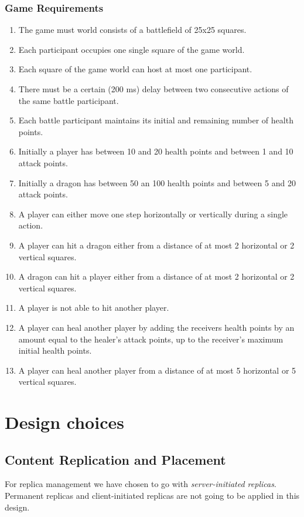 \documentclass{article}
\begin{document}
\subsubsection{Game Requirements}
\begin{enumerate}
	\item The game must world consists of a battlefield of 25x25 squares.
	\item Each participant occupies one single  square of the game world.
	\item Each square of the game world can host at most one participant.
	\item There must be a certain (200 ms) delay between two consecutive actions of the same battle participant.
	\item Each battle participant maintains its initial and remaining number of health points.
	\item Initially a player has between 10 and 20 health points and between 1 and 10 attack points.
	\item Initially a dragon has between 50 an 100 health points and between 5 and 20 attack points.
	\item A player can either move one step horizontally or vertically during a single action.
	\item A player can hit a dragon either from a distance of at most 2 horizontal or 2 vertical squares.
	\item A dragon can hit a player either from a distance of at most 2 horizontal or 2 vertical squares.
	\item A player is not able to hit another player.
	\item A player can heal another player by adding the receivers health points by an amount equal to the healer's attack points, up to the receiver's maximum initial health points. 
	\item A player can heal another player from a distance of at most 5 horizontal or 5 vertical squares.
\end{enumerate}

\section{Design choices}
\subsection{Content Replication and Placement}
For replica management we have chosen to go with \emph{server-initiated replicas}. Permanent replicas and client-initiated replicas are not going to be applied in this design. 
\end{document}
